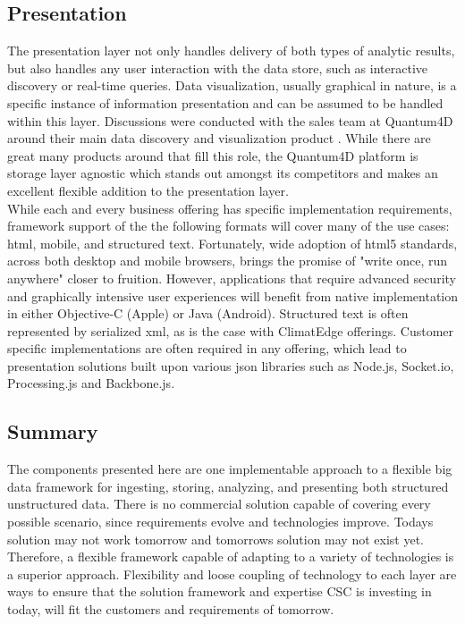 \subsection{Presentation}
The presentation layer not only handles delivery of both types of analytic results, but also handles any user interaction with the data store, such as interactive discovery or real-time queries. Data visualization, usually graphical in nature,  is a specific instance of information presentation and can be assumed to be handled within this layer. Discussions were conducted with the sales team at Quantum4D around their main data discovery and visualization product \cite{quantum}. While there are great many products around that fill this role, the Quantum4D platform is storage layer agnostic which stands out amongst its competitors and makes an excellent flexible addition to the presentation layer.\\

 While each and every business offering has specific implementation requirements, framework support of the the following formats will cover many of the use cases: \gls{html}, mobile, and structured text. Fortunately, wide adoption of \gls{html}5 standards, across both desktop and mobile browsers, brings the promise of "write once, run anywhere" closer to fruition. However, applications that require advanced security and graphically intensive user experiences will benefit from native implementation in either Objective-C (Apple) or Java (Android). Structured text is often represented by serialized \gls{xml}, as is the case with ClimatEdge offerings. Customer specific implementations are often required in any offering, which lead to presentation solutions built upon various \gls{json} libraries such as Node.js, Socket.io, Processing.js and Backbone.js.
\subsection{Summary}
The components presented here are one implementable approach to a flexible big data framework for ingesting, storing, analyzing, and presenting both structured unstructured data. There is no commercial solution capable of covering every possible scenario, since requirements evolve and technologies improve. Todays solution may not work tomorrow and tomorrows solution may not exist yet. Therefore, a flexible framework capable of adapting to a variety of technologies is a superior approach. Flexibility and loose coupling of technology to each layer are ways to ensure that the solution framework and expertise \textsc{CSC} is investing in today, will fit the customers and requirements of tomorrow.